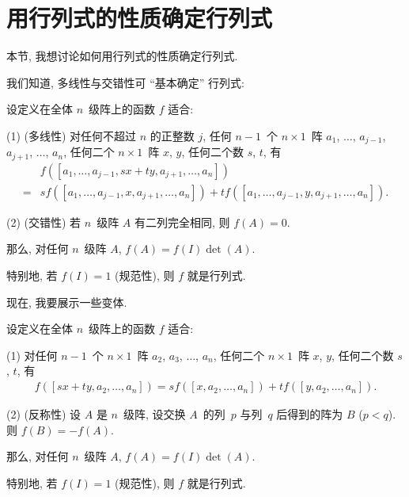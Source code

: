 \section{用行列式的性质确定行列式}

本节, 我想讨论如何用行列式的性质确定行列式.

我们知道, 多线性与交错性可 ``基本确定'' 行列式:

\begin{theorem}
    设定义在全体 \(n\)~级阵上的函数 \(f\) 适合:

    (1)
    (多线性)
    对任何不超过 \(n\) 的正整数 \(j\),
    任何 \(n-1\)~个 \(n \times 1\)~阵
    \(a_1\), \(\dots\), \(a_{j-1}\),
    \(a_{j+1}\), \(\dots\), \(a_n\),
    任何二个 \(n \times 1\)~阵 \(x\), \(y\),
    任何二个数 \(s\), \(t\),
    有
    \begin{align*}
             & f
            {([a_1, \dots, a_{j-1}, sx + ty,
                        a_{j+1}, \dots, a_n])}
        \\
        = {} &
        s
        f {([a_1, \dots, a_{j-1}, x, a_{j+1}, \dots, a_n])}
        +
        t
        f {([a_1, \dots, a_{j-1}, y, a_{j+1}, \dots, a_n])}.
    \end{align*}

    (2)
    (交错性)
    若 \(n\)~级阵 \(A\) 有二列完全相同,
    则 \(f(A) = 0\).

    那么, 对任何 \(n\)~级阵 \(A\),
    \(f(A) = f(I) \det {(A)}\).

    特别地, 若 \(f(I) = 1\) (规范性),
    则 \(f\) 就是行列式.
\end{theorem}

现在, 我要展示一些变体.

\begin{theorem}
    设定义在全体 \(n\)~级阵上的函数 \(f\) 适合:

    (1)
    对任何 \(n-1\)~个 \(n \times 1\)~阵
    \(a_2\), \(a_3\), \(\dots\), \(a_n\),
    任何二个 \(n \times 1\)~阵 \(x\), \(y\),
    任何二个数 \(s\), \(t\),
    有
    \begin{align*}
        f {([sx + ty, a_2, \dots, a_n])}
        =
        s
        f {([x, a_2, \dots, a_n])}
        +
        t
        f {([y, a_2, \dots, a_n])}.
    \end{align*}

    (2)
    (反称性)
    设 \(A\) 是 \(n\)~级阵,
    设交换 \(A\)~的列~\(p\) 与列~\(q\) 后得到的阵为 \(B\)
    (\(p < q\)).
    则 \(f(B) = -f(A)\).

    那么, 对任何 \(n\)~级阵 \(A\),
    \(f(A) = f(I) \det {(A)}\).

    特别地, 若 \(f(I) = 1\) (规范性),
    则 \(f\) 就是行列式.
\end{theorem}

